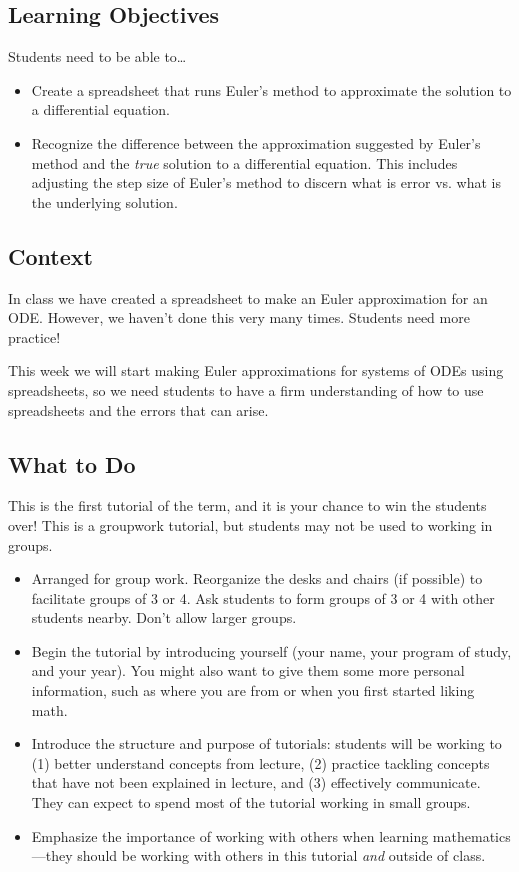		\subsection*{Learning Objectives} Students need to be able to\ldots
		\begin{itemize}
			\item Create a spreadsheet that runs Euler's method to approximate the solution to a differential equation.
			\item Recognize the difference between the approximation suggested by Euler's method and the \emph{true} solution
			to a differential equation. This includes adjusting the step size of Euler's method to discern what is error vs. what
			is the underlying solution.
		\end{itemize}


		\subsection*{Context} In class we have created a spreadsheet to make an Euler approximation
		for an ODE. However, we haven't done this very many times. Students need more practice!

		This week we will start making Euler approximations for systems of ODEs using spreadsheets,
		so we need students to have a firm understanding of how to use spreadsheets and the errors
		that can arise.


		\subsection*{What to Do} This is the first tutorial of the term, and
		it is your chance to win the students over! This is a groupwork tutorial,
		but students may not be used to working in groups.

		\begin{itemize}
			\item Arranged for group work. Reorganize the desks and chairs
				(if possible) to facilitate groups of 3 or 4. Ask
				students to form groups of 3 or 4 with other students
				nearby. Don't allow larger groups.

			\item Begin the tutorial by introducing yourself (your name,
				your program of study, and your year). You might
				also want to give them some more personal information,
				such as where you are from or when you first started liking math.

			\item Introduce the structure and purpose of tutorials: students
				will be working to (1) better understand concepts
				from lecture, (2) practice tackling concepts that
				have not been explained in lecture, and (3) effectively
				communicate. They can expect to spend most of the
				tutorial working in small groups.

			\item Emphasize the importance of working with others when
				learning mathematics---they should be working with
				others in this tutorial \emph{and} outside of
				class.
		\end{itemize}

